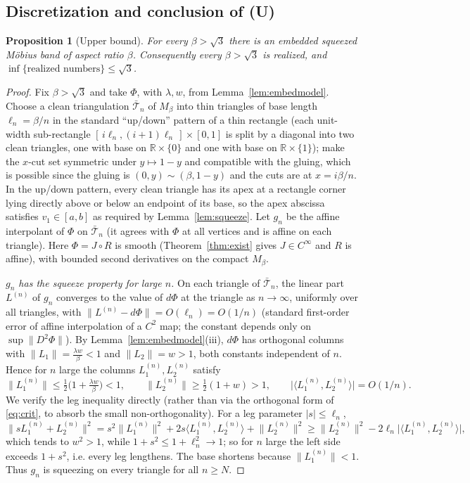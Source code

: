 \documentclass[11pt]{article}
\newtheorem{proposition}{Proposition}
\theoremstyle{definition}
\newcommand{\R}{\mathbb{R}}
\newcommand{\norm}[1]{\lVert #1 \rVert}
\newcommand{\abs}[1]{\lvert #1 \rvert}
\begin{document}
\subsection{Discretization and conclusion of (U)}

\begin{proposition}[Upper bound]\label{prop:upper}
For every $\beta>\sqrt3$ there is an embedded squeezed M\"obius band of aspect ratio
$\beta$. Consequently every $\beta>\sqrt3$ is realized, and
$\inf\{\text{realized numbers}\}\le\sqrt3$.
\end{proposition}

\begin{proof}
Fix $\beta>\sqrt3$ and take $\Phi$, with $\lambda,w$, from Lemma~\ref{lem:embedmodel}. Choose a clean
triangulation $\bar{\mathcal T}_n$ of $M_\beta$ into thin triangles of base length
$\ell_n=\beta/n$ in the standard ``up/down'' pattern of a thin rectangle (each unit-width
sub-rectangle $[\,i\ell_n,(i+1)\ell_n\,]\times[0,1]$ is split by a diagonal into two clean
triangles, one with base on $\R\times\{0\}$ and one with base on $\R\times\{1\}$); make the
$x$-cut set symmetric under $y\mapsto1-y$ and compatible with the gluing, which is possible
since the gluing is $(0,y)\sim(\beta,1-y)$ and the cuts are at $x=i\beta/n$. In the up/down pattern, every clean triangle has its apex at a rectangle corner lying
directly above or below an endpoint of its base, so the apex abscissa satisfies $v_1\in[a,b]$
as required by Lemma~\ref{lem:squeeze}. Let $g_n$ be the affine interpolant of $\Phi$ on
$\bar{\mathcal T}_n$ (it agrees with $\Phi$ at all vertices and is affine on each triangle).
Here $\Phi=J\circ R$ is smooth (Theorem~\ref{thm:exist} gives $J\in C^\infty$ and $R$ is
affine), with bounded second derivatives on the compact $M_\beta$.

\emph{$g_n$ has the squeeze property for large $n$.} On each triangle of
$\bar{\mathcal T}_n$, the linear part $L^{(n)}$ of $g_n$ converges to the value of $d\Phi$ at
the triangle as $n\to\infty$, uniformly over all triangles, with
$\norm{L^{(n)}-d\Phi}=O(\ell_n)=O(1/n)$ (standard first-order error of affine interpolation
of a $C^2$ map; the constant depends only on $\sup\norm{D^2\Phi}$). By
Lemma~\ref{lem:embedmodel}(iii), $d\Phi$ has orthogonal columns with
$\norm{L_1}=\tfrac{\lambda w}{\beta}<1$ and $\norm{L_2}=w>1$, both constants independent of
$n$. Hence for $n$ large the columns $L_1^{(n)},L_2^{(n)}$ satisfy
\[
\norm{L_1^{(n)}}\le \tfrac12\Big(1+\tfrac{\lambda w}{\beta}\Big)<1,\qquad
\norm{L_2^{(n)}}\ge \tfrac12(1+w)>1,\qquad
\abs{\langle L_1^{(n)},L_2^{(n)}\rangle}=O(1/n).
\]
We verify the leg inequality directly (rather than via the orthogonal form of
\eqref{eq:crit}, to absorb the small non-orthogonality). For a leg parameter $\abs s\le\ell_n$,
\[
\norm{sL_1^{(n)}+L_2^{(n)}}^2
=s^2\norm{L_1^{(n)}}^2+2s\langle L_1^{(n)},L_2^{(n)}\rangle+\norm{L_2^{(n)}}^2
\ge \norm{L_2^{(n)}}^2-2\ell_n\abs{\langle L_1^{(n)},L_2^{(n)}\rangle},
\]
which tends to $w^2>1$, while $1+s^2\le 1+\ell_n^2\to1$; so for $n$ large the left side
exceeds $1+s^2$, i.e. every leg lengthens. The base shortens because
$\norm{L_1^{(n)}}<1$. Thus $g_n$ is squeezing on every triangle for all $n\ge N$.


\end{proof}
\end{document}
